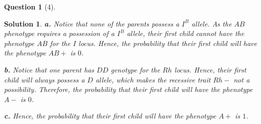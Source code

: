 \documentclass{article} %
\theoremstyle{quest}
\newtheorem*{question}{Question}
\newtheorem*{solution}{Solution}
\begin{document}
\bigskip

\begin{question}[4]
\end{question}
\begin{solution}
\textbf{a.} 
Notice that none of the parents possess a $I^B$ allele. As the $AB$ phenotype requires 
a possession of a $I^B$ allele, their first child cannot have the phenotype $AB$ for the
$I$ locus. Hence, the probability that their first child will have the phenotype $AB+$ is
$0$.

\smallskip

\textbf{b.} Notice that one parent has $DD$ genotype for the $Rh$ locus. Hence, their first
child will always possess a $D$ allele, which makes the recessive trait $Rh-$ not a
possibility. Therefore, the probability that their first child will have the phenotype $A-$
is $0$.

\smallskip

\textbf{c.} Hence, the probability that their first child will have the phenotype $A+$ is $1$.


\end{solution}
\end{document}
